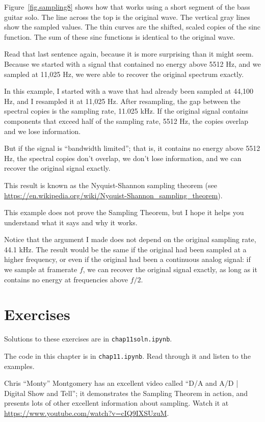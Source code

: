 \documentclass[12pt]{book}
\begin{document}
Figure~\ref{fig.sampling8} shows how that works using a short segment
of the bass guitar solo.  The line across the top is the original
wave.  The vertical gray lines show the sampled values.  The thin
curves are the shifted, scaled copies of the sinc function.
The sum of these sinc functions is identical to the original wave.

Read that last sentence again, because it is more surprising than it
might seem.  Because we started with a signal that contained no energy
above 5512 Hz, and we sampled at 11,025 Hz, we were able to recover
the original spectrum exactly.

In this example, I started with a wave that had already been
sampled at 44,100 Hz, and I resampled it at 11,025 Hz.  After
resampling, the gap between the spectral copies is the sampling
rate, 11.025 kHz.  If the original signal contains components that
exceed half of the sampling rate, 5512 Hz, the copies overlap
and we lose information.

But if the signal is ``bandwidth limited''; that is, it contains no
energy above 5512 Hz, the spectral copies don't overlap, we don't lose
information, and we can recover the original signal exactly.

This result is known as the Nyquist-Shannon sampling theorem (see
\url{https://en.wikipedia.org/wiki/Nyquist-Shannon_sampling_theorem}).

This example does not prove the Sampling Theorem, but I hope it
helps you understand what it says and why it works.

Notice that the argument I made does
not depend on the original sampling rate, 44.1 kHz.  The result
would be the same if the original had been sampled at a higher
frequency, or even if the original had been a continuous analog
signal: if we sample at framerate $f$, we can recover the original
signal exactly, as long as it contains no energy at frequencies
above $f/2$.


\section{Exercises}

Solutions to these exercises are in {\tt chap11soln.ipynb}.

\begin{exercise}
The code in this chapter is in {\tt chap11.ipynb}.  Read through
it and listen to the examples.
\end{exercise}


\begin{exercise}
Chris ``Monty'' Montgomery has an excellent video called ``D/A and A/D
| Digital Show and Tell''; it demonstrates the Sampling Theorem in
action, and presents lots of other excellent information about
sampling.  Watch it at
\url{https://www.youtube.com/watch?v=cIQ9IXSUzuM}.
\end{exercise}
\end{document}
